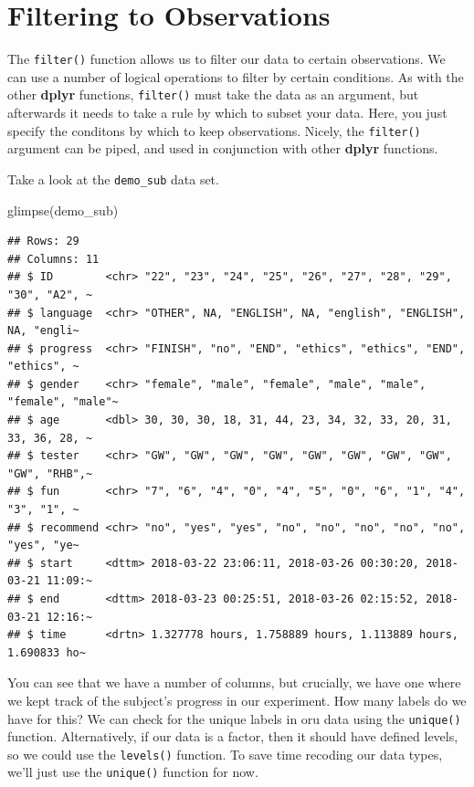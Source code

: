 \documentclass[
]{book}
\newenvironment{Shaded}{\begin{snugshade}}{\end{snugshade}}
\newcommand{\FunctionTok}[1]{\textcolor[rgb]{0.00,0.00,0.00}{#1}}
\newcommand{\NormalTok}[1]{#1}
\begin{document}
\hypertarget{filtering-to-observations}{%
\section{Filtering to Observations}\label{filtering-to-observations}}

The \texttt{filter()} function allows us to filter our data to certain observations. We can use a number of logical operations to filter by certain conditions. As with the other \textbf{dplyr} functions, \texttt{filter()} must take the data as an argument, but afterwards it needs to take a rule by which to subset your data. Here, you just specify the conditons by which to keep observations. Nicely, the \texttt{filter()} argument can be piped, and used in conjunction with other \textbf{dplyr} functions.

Take a look at the \texttt{demo\_sub} data set.

\begin{Shaded}
\begin{Highlighting}[]
\FunctionTok{glimpse}\NormalTok{(demo\_sub)}
\end{Highlighting}
\end{Shaded}

\begin{verbatim}
## Rows: 29
## Columns: 11
## $ ID        <chr> "22", "23", "24", "25", "26", "27", "28", "29", "30", "A2", ~
## $ language  <chr> "OTHER", NA, "ENGLISH", NA, "english", "ENGLISH", NA, "engli~
## $ progress  <chr> "FINISH", "no", "END", "ethics", "ethics", "END", "ethics", ~
## $ gender    <chr> "female", "male", "female", "male", "male", "female", "male"~
## $ age       <dbl> 30, 30, 30, 18, 31, 44, 23, 34, 32, 33, 20, 31, 33, 36, 28, ~
## $ tester    <chr> "GW", "GW", "GW", "GW", "GW", "GW", "GW", "GW", "GW", "RHB",~
## $ fun       <chr> "7", "6", "4", "0", "4", "5", "0", "6", "1", "4", "3", "1", ~
## $ recommend <chr> "no", "yes", "yes", "no", "no", "no", "no", "no", "yes", "ye~
## $ start     <dttm> 2018-03-22 23:06:11, 2018-03-26 00:30:20, 2018-03-21 11:09:~
## $ end       <dttm> 2018-03-23 00:25:51, 2018-03-26 02:15:52, 2018-03-21 12:16:~
## $ time      <drtn> 1.327778 hours, 1.758889 hours, 1.113889 hours, 1.690833 ho~
\end{verbatim}

You can see that we have a number of columns, but crucially, we have one where we kept track of the subject's progress in our experiment. How many labels do we have for this? We can check for the unique labels in oru data using the \texttt{unique()} function. Alternatively, if our data is a factor, then it should have defined levels, so we could use the \texttt{levels()} function. To save time recoding our data types, we'll just use the \texttt{unique()} function for now.
\end{document}
